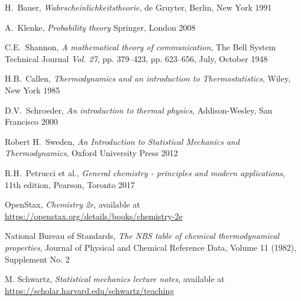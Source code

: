 \documentclass[a4paper, draft]{article}
\theoremstyle{own}
\theoremstyle{remark}
\begin{document}
\begin{thebibliography}{9}
	
H.~Bauer,
{\em Wahrscheinlichkeitstheorie},
de Gruyter, Berlin, New York 1991
	
A.~Klenke,
{\em Probability theory}
Springer, London 2008


C.E.~Shannon,
{\em A mathematical theory of communication}, 
The Bell System Technical Journal {\em Vol. 27}, pp. 379--423, pp. 623--656, July, October 1948



H.B.~Callen,
{\em Thermodynamics and an introduction to Thermostatistics},
Wiley, New York 1985


D.V.~Schroeder,
{\em An introduction to thermal physics},
Addison-Wesley, San Francisco 2000

Robert H.~Sweden,
{\em An Introduction to Statistical Mechanics and Thermodynamics}, Oxford University Press 2012

R.H.~Petrucci et al., 
{\em General chemistry - principles and modern applications}, 11th edition, Pearson, Toronto 2017

OpenStax, {\em Chemistry 2e}, available at \url{https://openstax.org/details/books/chemistry-2e}

National Bureau of Standards, {\em The NBS table of chemical thermodynamical properties}, Journal of Physical and Chemical Reference Data, Volume 11 (1982), Supplement No. 2

M. Schwartz, {\em Statistical mechanics lecture notes}, available at \url{https://scholar.harvard.edu/schwartz/teaching}	

\end{thebibliography}
\end{document}
